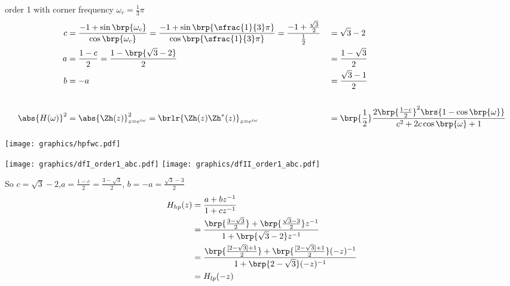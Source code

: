 \begin{example}order 1  with corner frequency $\omega_c=\frac{1}{3}\pi$
\begin{align*}
  c &= \frac{-1 + \sin\brp{\omega_c}}{\cos\brp{\omega_c}}
     = \frac{-1 + \sin\brp{\sfrac{1}{3}\pi}}{\cos\brp{\sfrac{1}{3}\pi}}
     = \frac{-1 + \frac{\sqrt{3}}{2}}{\frac{1}{2}}
   &&= \sqrt{3} - 2
  \\
  a &= \frac{1-c}{2}
     = \frac{1-\brp{\sqrt{3} - 2}}{2}
   &&= \frac{1-\sqrt{3}}{2}
  \\
  b &= -a
   &&= \frac{\sqrt{3} - 1}{2}
  \\
  \\
  \abs{H(\omega)}^2
    &= \abs{\Zh(z)}^2_{z=e^{i\omega}}
     = \brlr{\Zh(z)\Zh^\ast(z)}_{z=e^{i\omega}}
   &&= \brp{\frac{1}{2}}\frac{2\brp{\frac{1-c}{2}}^2\brs{1 -  \cos\brp{\omega}}}
            {c^2 + 2 c\cos\brp{\omega} + 1}
\end{align*}


\texttt{[image: graphics/hpfwc.pdf]}

\texttt{[image: graphics/dfI\_order1\_abc.pdf]}
\texttt{[image: graphics/dfII\_order1\_abc.pdf]}
\end{example}


So $c=\sqrt{3}-2$,\qquad $a=\frac{1-c}{2}=\frac{3-\sqrt{3}}{2}$, \qquad $b=-a=\frac{\sqrt{3}-3}{2}$
\begin{align*}
  H_{hp}(z)
    &= \frac{a + bz^{-1}}{1+cz^{-1}}
  \\&= \frac{\brp{\frac{3-\sqrt{3}}{2}} + \brp{\frac{\sqrt{3}-3}{2}}z^{-1}}
            {1+\brp{\sqrt{3}-2}z^{-1}}
  \\&= \frac{\brp{\frac{[2-\sqrt{3}]+1}{2}} + \brp{\frac{[2-\sqrt{3}]+1}{2}}(-z)^{-1}}
            {1+\brp{2-\sqrt{3}}(-z)^{-1}}
  \\&= H_{lp}(-z)
\end{align*}



